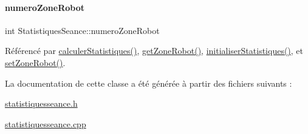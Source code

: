 \mbox{\label{class_statistiques_seance_aeea50e7fc9b2308e365f77f27e3f86ee}} 
\paragraph{\texorpdfstring{numero\+Zone\+Robot}{numeroZoneRobot}}
{\footnotesize\ttfamily int Statistiques\+Seance\+::numero\+Zone\+Robot\hspace{0.3cm}{\ttfamily [private]}}



Référencé par \hyperlink{class_statistiques_seance_a8bf60224113e3697adfe0a4f8f22ab7b}{calculer\+Statistiques()}, \hyperlink{class_statistiques_seance_ad1bdc22fbd9f37fab06d9fc24e9f1bc4}{get\+Zone\+Robot()}, \hyperlink{class_statistiques_seance_a17e1c49e2986a8490ff96e4bd7733291}{initialiser\+Statistiques()}, et \hyperlink{class_statistiques_seance_a97a0cf5b45add60d7a3e31207fe360a0}{set\+Zone\+Robot()}.



La documentation de cette classe a été générée à partir des fichiers suivants \+:\begin{DoxyCompactItemize}
\item 
\hyperlink{statistiquesseance_8h}{statistiquesseance.\+h}\item 
\hyperlink{statistiquesseance_8cpp}{statistiquesseance.\+cpp}\end{DoxyCompactItemize}

